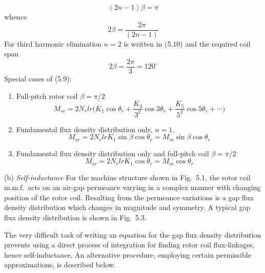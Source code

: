 \documentclass[a4paper,numbers=noenddot,12pt]{scrbook}
\begin{document}
\begin{equation*}
    (2n - 1)\beta = \pi
\end{equation*}
whence
\begin{equation}
    2\beta=\frac{2\pi}{(2n-1)}
\end{equation}
For third harmonic elimination $n = 2$ is written in (5.10) and the required coil span
\begin{equation*}
    2\beta = \frac{2\pi}{3} = 120^{\circ}
\end{equation*}
Special cases of (5.9):
\begin{enumerate}
    \item Full-pitch rotor coil $\beta = \pi/2$
        \begin{equation}
            M_{sr} = 2 N_r l r \bigg( K_1 \cos\theta_r + \frac{K_3}{3^2} \cos 3 \theta_r + \frac{K_5}{5^2} \cos 5 \theta_r + \cdots \bigg)
        \end{equation}
    \item
        Fundamental flux density distribution only, $n=1$,
        \begin{equation}
            M_{sr}=2N_r l r K_1 \sin\beta\cos\theta_r = M_m \sin \beta \cos \theta_r
        \end{equation}
    \item
        Fundamental flux density distribution only and full-pitch coil $\beta=\pi/2$
        \begin{equation}
            M_{sr} = 2 N_r l r K_1 \cos\theta_r = M_m \cos\theta_r
        \end{equation}
\end{enumerate}

\noindent
(b) \textit{Self-inductance} For the machine structure shown in Fig.\ 5.1, the rotor coil m.m.f.\ acts on an air-gap permeance varying in a complex manner with changing position of the rotor coil. Resulting from the permeance variations is a gap flux density distribution which changes in magnitude and symmetry. A typical gap flux density distribution is shown in Fig.\ 5.3. \par

The very difficult task of writing an equation for the gap flux density distribution prevents using a direct process of integration for finding rotor coil flux-linkages, hence self-inductance. An alternative procedure, employing certain permissible approximations, is described below. \par
\end{document}
